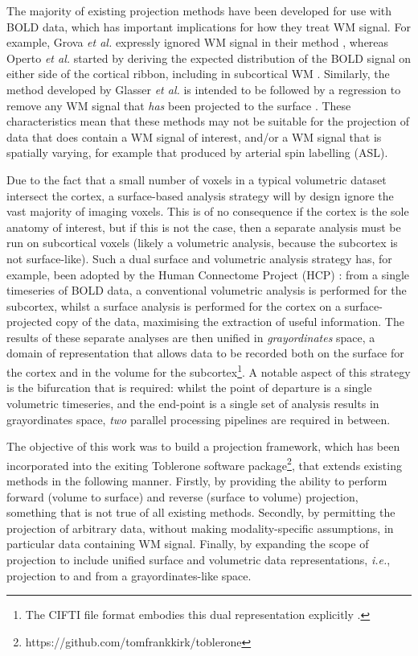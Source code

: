 \documentclass[review]{elsarticle}
\begin{document}
The majority of existing projection methods have been developed for use with BOLD data, which has important implications for how they treat WM signal. For example, Grova \textit{et al.} expressly ignored WM signal in their method \cite{Grova2006}, whereas Operto \textit{et al.} started by deriving the expected distribution of the BOLD signal on either side of the cortical ribbon, including in subcortical WM \cite{Operto2008}. Similarly, the method developed by Glasser \textit{et al.} is intended to be followed by a regression to remove any WM signal that \textit{has} been projected to the surface \cite{Glasser2013}. These characteristics mean that these methods may not be suitable for the projection of data that does contain a WM signal of interest, and/or a WM signal that is spatially varying, for example that produced by arterial spin labelling (ASL). 

Due to the fact that a small number of voxels in a typical volumetric dataset intersect the cortex, a surface-based analysis strategy will by design ignore the vast majority of imaging voxels. This is of no consequence if the cortex is the sole anatomy of interest, but if this is not the case, then a separate analysis must be run on subcortical voxels (likely a volumetric analysis, because the subcortex is not surface-like). Such a dual surface and volumetric analysis strategy has, for example, been adopted by the Human Connectome Project (HCP) \cite{hcp_overview, Glasser2013}: from a single timeseries of BOLD data, a conventional volumetric analysis is performed for the subcortex, whilst a surface analysis is performed for the cortex on a surface-projected copy of the data, maximising the extraction of useful information. The results of these separate analyses are then unified in \textit{grayordinates} space, a domain of representation that allows data to be recorded both on the surface for the cortex and in the volume for the subcortex\footnote{The CIFTI file format embodies this dual representation explicitly \cite{cifti}.}. A notable aspect of this strategy is the bifurcation that is required: whilst the point of departure is a single volumetric timeseries, and the end-point is a single set of analysis results in grayordinates space, \textit{two} parallel processing pipelines are required in between. 

The objective of this work was to build a projection framework, which has been incorporated into the exiting Toblerone software package\footnote{https://github.com/tomfrankkirk/toblerone}, that extends existing methods in the following manner. Firstly, by providing the ability to perform forward (volume to surface) and reverse (surface to volume) projection, something that is not true of all existing methods. Secondly, by permitting the projection of arbitrary data, without making modality-specific assumptions, in particular data containing WM signal. Finally, by expanding the scope of projection to include unified surface and volumetric data representations, \textit{i.e.}, projection to and from a grayordinates-like space. 
\end{document}
